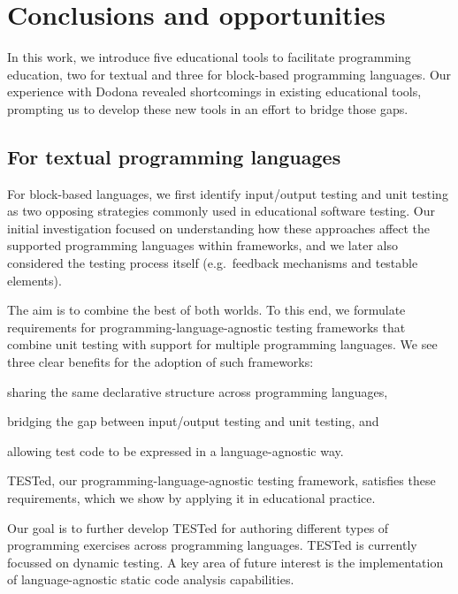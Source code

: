 \documentclass[main]{subfiles}
\begin{document}
\chapter{Conclusions and opportunities}\label{ch:conclusions-and-opportunities}

In this work, we introduce five educational tools to facilitate programming education, two for textual and three for block-based programming languages.
Our experience with Dodona revealed shortcomings in existing educational tools, prompting us to develop these new tools in an effort to bridge those gaps.


\section{For textual programming languages}\label{sec:for-textual-programming-languages}

For block-based languages, we first identify input/output testing and unit testing as two opposing strategies commonly used in educational software testing.
Our initial investigation focused on understanding how these approaches affect the supported programming languages within frameworks, and we later also considered the testing process itself (e.g.\ feedback mechanisms and testable elements).

The aim is to combine the best of both worlds.
To this end, we formulate requirements for programming-language-agnostic testing frameworks that combine unit testing with support for multiple programming languages.
We see three clear benefits for the adoption of such frameworks: \begin{enumerate*}[label=\emph{\roman*})] \item sharing the same declarative structure across programming languages, \item bridging the gap between input/output testing and unit testing, and \item allowing test code to be expressed in a language-agnostic way.\end{enumerate*}

TESTed, our programming-language-agnostic testing framework, satisfies these requirements, which we show by applying it in educational practice.

Our goal is to further develop TESTed for authoring different types of programming exercises across programming languages.
TESTed is currently focussed on dynamic testing.
A key area of future interest is the implementation of language-agnostic static code analysis capabilities.
\end{document}
